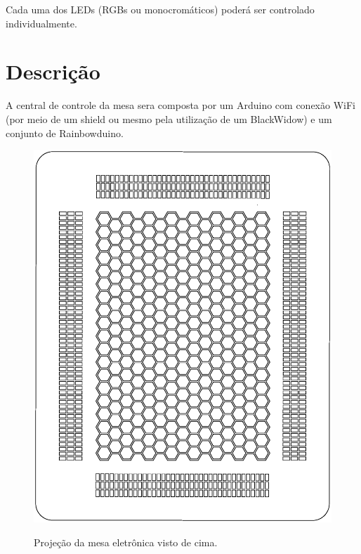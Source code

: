 \documentclass[a4paper,10pt]{article}
\begin{document}
Cada uma dos LEDs (RGBs ou monocromáticos) poderá ser controlado individualmente.


\section{Descrição}

A central de controle da mesa sera composta por um Arduino com conexão WiFi (por meio de um shield ou mesmo pela utilização de um BlackWidow) e um conjunto de Rainbowduino. \\

\begin{center}
\begin{figure}[h!]
	\center
	\includegraphics[angle=0, scale=0.40]{./img/layout-v02.ps}
	\label{figura_layout}
	\caption{Projeção da mesa eletrônica visto de cima.}
\end{figure}
\end{center}
\end{document}
